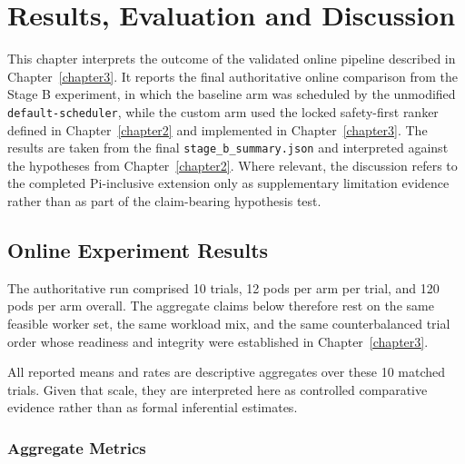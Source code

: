 \chapter{Results, Evaluation and Discussion}
\label{chapter4}

This chapter interprets the outcome of the validated online pipeline described in Chapter~\ref{chapter3}. It reports the final authoritative online comparison from the Stage B experiment, in which the baseline arm was scheduled by the unmodified \texttt{default-scheduler}, while the custom arm used the locked safety-first ranker defined in Chapter~\ref{chapter2} and implemented in Chapter~\ref{chapter3}. The results are taken from the final \texttt{stage\_b\_summary.json} and interpreted against the hypotheses from Chapter~\ref{chapter2}. Where relevant, the discussion refers to the completed Pi-inclusive extension only as supplementary limitation evidence rather than as part of the claim-bearing hypothesis test.


\section{Online Experiment Results}
\label{sec:results}

The authoritative run comprised 10 trials, 12 pods per arm per trial, and 120 pods per arm overall. The aggregate claims below therefore rest on the same feasible worker set, the same workload mix, and the same counterbalanced trial order whose readiness and integrity were established in Chapter~\ref{chapter3}.

All reported means and rates are descriptive aggregates over these 10 matched trials. Given that scale, they are interpreted here as controlled comparative evidence rather than as formal inferential estimates.

\subsection{Aggregate Metrics}

